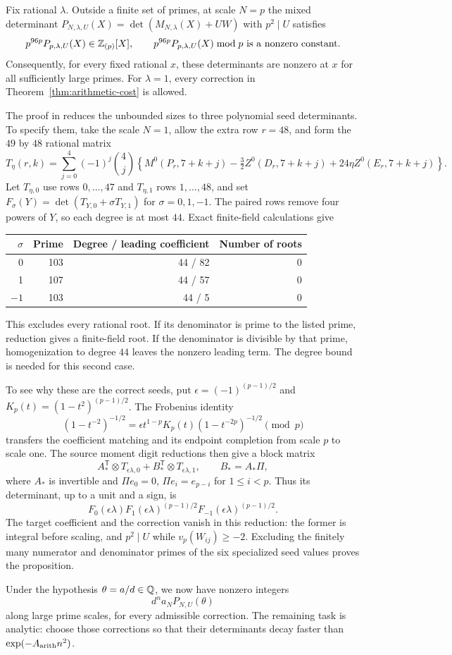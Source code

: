 \begin{proposition}\label{prop:moment-nonvanishing}
Fix rational $\lambda$. Outside a finite set of primes, at scale $N=p$
the mixed determinant
$P_{N,\lambda,U}(X)=\det(M_{N,\lambda}(X)+UW)$ with $p^2\mid U$ satisfies
\[
 p^{96p}P_{p,\lambda,U}(X)\in\mathbb Z_{(p)}[X],
 \qquad p^{96p}P_{p,\lambda,U}(X)\bmod p
       \text{ is a nonzero constant}.
\]
Consequently, for every fixed rational $x$, these determinants are
nonzero at $x$ for all sufficiently large primes. For $\lambda=1$,
every correction in Theorem~\ref{thm:arithmetic-cost} is allowed.
\end{proposition}

The proof in  reduces the unbounded sizes to three polynomial
seed determinants. To specify them, take the scale $N=1$, allow the
extra row $r=48$, and form the $49$ by $48$ rational matrix
\[
 T_\eta(r,k)=\sum_{j=0}^4(-1)^j\binom4j
 \left\{M^0(P_r,7+k+j)-\tfrac32Z^0(D_r,7+k+j)
                  +24\eta Z^0(E_r,7+k+j)\right\}.
\]
Let $T_{\eta,0}$ use rows $0,\ldots,47$ and $T_{\eta,1}$ rows
$1,\ldots,48$, and set
$F_\sigma(Y)=\det(T_{Y,0}+\sigma T_{Y,1})$ for $\sigma=0,1,-1$.
The paired rows remove four powers of $Y$, so each degree is at most
$44$. Exact finite-field calculations give
\begin{center}
\begin{tabular}{rrrr}
\toprule
$\sigma$&Prime&Degree / leading coefficient&Number of roots\\
\midrule
0&103&44 / 82&0\\
1&107&44 / 57&0\\
$-1$&103&44 / 5&0\\
\bottomrule
\end{tabular}
\end{center}
This excludes every rational root. If its denominator is prime to the
listed prime, reduction gives a finite-field root. If the denominator
is divisible by that prime, homogenization to degree $44$ leaves the
nonzero leading term. The degree bound is needed for this second case.

To see why these are the correct seeds, put
$\epsilon=(-1)^{(p-1)/2}$ and $K_p(t)=(1-t^2)^{(p-1)/2}$. The
Frobenius identity
\[
 (1-t^{-2})^{-1/2}
 =\epsilon t^{1-p}K_p(t)(1-t^{-2p})^{-1/2}\pmod p
\]
transfers the coefficient matching and its endpoint completion from
scale $p$ to scale one. The source moment digit reductions then give
a block matrix
\[
 A_*^{\mathsf T}\otimes T_{\epsilon\lambda,0}
 +B_*^{\mathsf T}\otimes T_{\epsilon\lambda,1},
 \qquad B_*=A_*\Pi,
\]
where $A_*$ is invertible and $\Pi e_0=0$, $\Pi e_i=e_{p-i}$ for
$1\le i<p$. Thus its determinant, up to a unit and a sign, is
\[
 F_0(\epsilon\lambda)
 F_1(\epsilon\lambda)^{(p-1)/2}
 F_{-1}(\epsilon\lambda)^{(p-1)/2}.
\]
The target coefficient and the correction vanish in this reduction:
the former is integral before scaling, and $p^2\mid U$ while
$v_p(W_{ij})\ge-2$. Excluding the finitely many numerator and denominator
primes of the six specialized seed values proves the proposition.

Under the hypothesis $\theta=a/d\in\mathbb Q$, we now have nonzero integers
\[
 d^n a_NP_{N,U}(\theta)
\]
along large prime scales, for every admissible correction. The remaining
task is analytic: choose those corrections so that their determinants
decay faster than $\exp(-A_{\rm arith}n^2)$.
